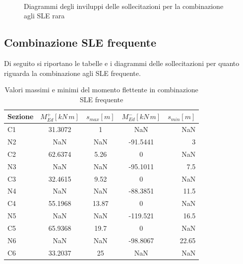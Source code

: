 \begin{figure}
 \centering
 \\
    
 \caption{Diagrammi degli inviluppi delle sollecitazioni per la combinazione agli SLE rara}
 \label{fig:envelope_sleRara}
\end{figure}

\cleardoublepage
\subsection{Combinazione SLE frequente}

Di seguito si riportano le tabelle e i diagrammi delle sollecitazioni per quanto riguarda la combinazione agli SLE frequente.

\begin{table}[ht!]
	\centering
	\caption{Valori massimi e minimi del momento flettente in combinazione SLE frequente}
	\label{tab:bendingMoment_sleFreq}
    \begin{tabular*}{\textwidth}{l @{\extracolsep{\fill}} cccr}
\toprule
Sezione &  $M_{Ed}^+ [kN\,m]$ &  $s_{max} [m]$ &  $M_{Ed}^- [kN\,m]$ &  $s_{min} [m] $\\
\midrule
C1      &     31.3072 &        1 &         NaN &      NaN \\
N2      &         NaN &      NaN &    -91.5441 &        3 \\
C2      &     62.6374 &     5.26 &           0 &      NaN \\
N3      &         NaN &      NaN &    -95.1011 &      7.5 \\
C3      &     32.4615 &     9.52 &           0 &      NaN \\
N4      &         NaN &      NaN &    -88.3851 &     11.5 \\
C4      &     55.1968 &    13.87 &           0 &      NaN \\
N5      &         NaN &      NaN &    -119.521 &     16.5 \\
C5      &     65.9368 &     19.7 &           0 &      NaN \\
N6      &         NaN &      NaN &    -98.8067 &    22.65 \\
C6      &     33.2037 &       25 &         NaN &      NaN \\
\bottomrule
    \end{tabular*}
\end{table}

